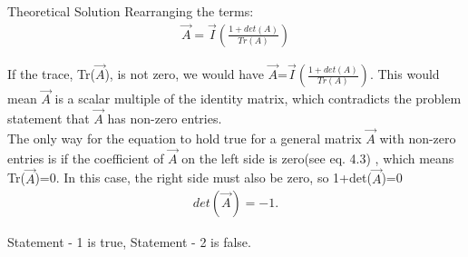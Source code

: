 \documentclass{beamer}
\begin{document}
\begin{frame}{Theoretical Solution}
Rearranging the terms:\\
\begin{align}
     \vec{A} = \vec{I}(\frac{1+det(A)}{Tr(A)}) 
\end{align}



If the trace, Tr($\vec{A}$), is not zero, we would have $\vec{A}$=$\vec{I}(\frac{1+det(A)}{Tr(A)})$. This would mean $\vec{A}$ is a scalar multiple of the identity matrix, which contradicts the problem statement that $\vec{A}$ has non-zero entries.\\

The only way for the equation to hold true for a general matrix $\vec{A}$ with non-zero entries is if the coefficient of $\vec{A}$ on the left side is zero(see eq. 4.3) , which means Tr($\vec{A}$)=0. In this case, the right side must also be zero, so 1+det($\vec{A}$)=0 \qquad 
\begin{align}
      det( \vec{A} )=-1.
\end{align}
  
    \begin{center}
    Statement - 1 is true, Statement - 2 is false.
\end{center}
\end{frame}
\end{document}
